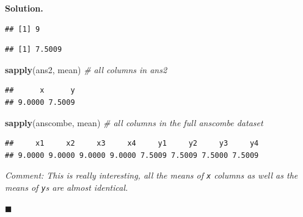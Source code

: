 \documentclass[10pt,b5paper,krantz1]{krantz}
\newenvironment{Shaded}{\begin{snugshade}}{\end{snugshade}}
\newcommand{\CommentTok}[1]{\textcolor[rgb]{0.37,0.37,0.37}{\textit{#1}}}
\newcommand{\KeywordTok}[1]{\textcolor[rgb]{0.27,0.27,0.27}{\textbf{#1}}}
\newcommand{\NormalTok}[1]{#1}
\newcommand{\OperatorTok}[1]{\textcolor[rgb]{0.43,0.43,0.43}{\textbf{#1}}}
\newenvironment{solution}{%
\bigskip\noindent\textbf{Solution. }%
\it\ignorespaces%
\ignorespaces%
}{\ignorespaces%
\hfill$\blacksquare$%
}
\begin{document}
\begin{solution}

\begin{Shaded}
\end{Shaded}

\begin{verbatim}
## [1] 9
\end{verbatim}

\begin{Shaded}
\end{Shaded}

\begin{verbatim}
## [1] 7.5009
\end{verbatim}

\begin{Shaded}
\begin{Highlighting}[]
\KeywordTok{sapply}\NormalTok{(ans2, mean) }\CommentTok{# all columns in ans2}
\end{Highlighting}
\end{Shaded}

\begin{verbatim}
##      x      y 
## 9.0000 7.5009
\end{verbatim}

\begin{Shaded}
\begin{Highlighting}[]
\KeywordTok{sapply}\NormalTok{(anscombe, mean) }\CommentTok{# all columns in the full anscombe dataset}
\end{Highlighting}
\end{Shaded}

\begin{verbatim}
##     x1     x2     x3     x4     y1     y2     y3     y4 
## 9.0000 9.0000 9.0000 9.0000 7.5009 7.5009 7.5000 7.5009
\end{verbatim}

\emph{Comment: This is really interesting, all the means of \texttt{x} columns
as well as the means of \texttt{y}s are almost identical.}

\end{solution}
\end{document}
